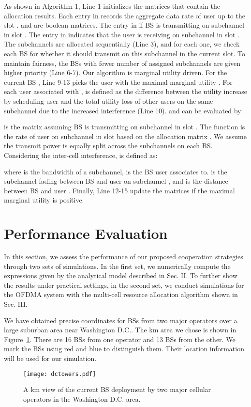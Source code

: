 \documentclass[conference]{IEEEtran}
\begin{document}
As shown in Algorithm 1, Line 1 initializes the matrices that contain the allocation results. Each entry  in  records the aggregate data rate of user  up to the slot .  and  are boolean matrices. The entry  in  if BS  is transmitting on subchannel  in slot . The entry  in  indicates that the user  is receiving on subchannel  in slot . The subchannels are allocated sequentially (Line 3), and for each one, we check each BS for whether it should transmit on this subchannel in the current slot. To maintain fairness, the BSs with fewer number of assigned subchannels are given higher priority (Line 6-7). Our algorithm is marginal utility driven. For the current BS , Line 9-13 picks the user with the maximal marginal utility . For each user  associated with ,  is defined as the difference between the utility increase  by scheduling user  and the total utility loss of other users on the same subchannel  due to the increased interference (Line 10).  and  can be evaluated by:


 is the matrix assuming BS  is transmitting on subchannel  in slot . The function  is the rate of user  on subchannel  in slot  based on the allocation matrix . We assume the transmit power is equally split across the subchannels on each BS. Considering the inter-cell interference,  is defined as:

where  is the bandwidth of a subchannel,  is the BS user  associates to.  is the subchannel fading between BS  and user  on subchannel , and  is the distance between BS  and user . Finally, Line 12-15 update the matrices if the maximal marginal utility is positive.

\section{Performance Evaluation}

In this section, we assess the performance of our proposed cooperation strategies through two sets of simulations. In the first set, we numerically compute the expressions given by the analytical model described in Sec. II. To further show the results under practical settings, in the second set, we conduct simulations for the OFDMA system with the multi-cell resource allocation algorithm shown in Sec. III.

We have obtained precise coordinates for BSs from two major operators over a large suburban area near Washington D.C.. The  km area we chose is shown in Figure~\ref{fig:dctowers}. There are 16 BSs from one operator and 13 BSs from the other. We mark the BSs using red and blue to distinguish them. Their location information will be used for our simulation.
\begin{figure}[htbp]
    \centerline{\texttt{[image: dctowers.pdf]}}
    \caption{
       A  km view of the current BS deployment by two major cellular operators in the Washington D.C. area.
    }
    \label{fig:dctowers}
\vspace{-0.3in}
\end{figure}
\end{document}
